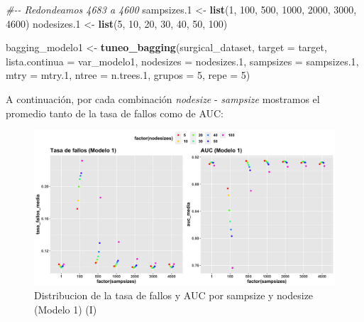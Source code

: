 \documentclass[
]{article}
\newenvironment{Shaded}{\begin{snugshade}}{\end{snugshade}}
\newcommand{\CommentTok}[1]{\textcolor[rgb]{0.56,0.35,0.01}{\textit{#1}}}
\newcommand{\DataTypeTok}[1]{\textcolor[rgb]{0.13,0.29,0.53}{#1}}
\newcommand{\DecValTok}[1]{\textcolor[rgb]{0.00,0.00,0.81}{#1}}
\newcommand{\FloatTok}[1]{\textcolor[rgb]{0.00,0.00,0.81}{#1}}
\newcommand{\KeywordTok}[1]{\textcolor[rgb]{0.13,0.29,0.53}{\textbf{#1}}}
\newcommand{\NormalTok}[1]{#1}
\newcommand{\StringTok}[1]{\textcolor[rgb]{0.31,0.60,0.02}{#1}}
\begin{document}
\begin{Shaded}
\begin{Highlighting}[]
\CommentTok{\#{-}{-} Redondeamos 4683 a 4600}
\NormalTok{sampsizes}\FloatTok{.1}\NormalTok{ <{-}}\StringTok{ }\KeywordTok{list}\NormalTok{(}\DecValTok{1}\NormalTok{, }\DecValTok{100}\NormalTok{, }\DecValTok{500}\NormalTok{, }\DecValTok{1000}\NormalTok{, }\DecValTok{2000}\NormalTok{, }\DecValTok{3000}\NormalTok{, }\DecValTok{4600}\NormalTok{)}
\NormalTok{nodesizes}\FloatTok{.1}\NormalTok{ <{-}}\StringTok{ }\KeywordTok{list}\NormalTok{(}\DecValTok{5}\NormalTok{, }\DecValTok{10}\NormalTok{, }\DecValTok{20}\NormalTok{, }\DecValTok{30}\NormalTok{, }\DecValTok{40}\NormalTok{, }\DecValTok{50}\NormalTok{, }\DecValTok{100}\NormalTok{)}

\NormalTok{bagging\_modelo1 <{-}}\StringTok{ }\KeywordTok{tuneo\_bagging}\NormalTok{(surgical\_dataset, }\DataTypeTok{target =}\NormalTok{ target,}
                                 \DataTypeTok{lista.continua =}\NormalTok{ var\_modelo1,}
                                 \DataTypeTok{nodesizes =}\NormalTok{ nodesizes}\FloatTok{.1}\NormalTok{,}
                                 \DataTypeTok{sampsizes =}\NormalTok{ sampsizes}\FloatTok{.1}\NormalTok{, }\DataTypeTok{mtry =}\NormalTok{ mtry}\FloatTok{.1}\NormalTok{,}
                                 \DataTypeTok{ntree =}\NormalTok{ n.trees}\FloatTok{.1}\NormalTok{, }\DataTypeTok{grupos =} \DecValTok{5}\NormalTok{, }\DataTypeTok{repe =} \DecValTok{5}\NormalTok{)}
\end{Highlighting}
\end{Shaded}

A continuación, por cada combinación \emph{nodesize} - \emph{sampsize}
mostramos el promedio tanto de la tasa de fallos como de AUC:

\begin{figure}[h!]

{\centering \includegraphics[width=0.99\linewidth,height=0.99\textheight,]{./charts/03_distribucion_auc_tasa_fallos_modelo1} 

}

\caption{Distribucion de la tasa de fallos y AUC por sampsize y nodesize (Modelo 1) (I)}\label{fig:unnamed-chunk-68}
\end{figure}
\end{document}
